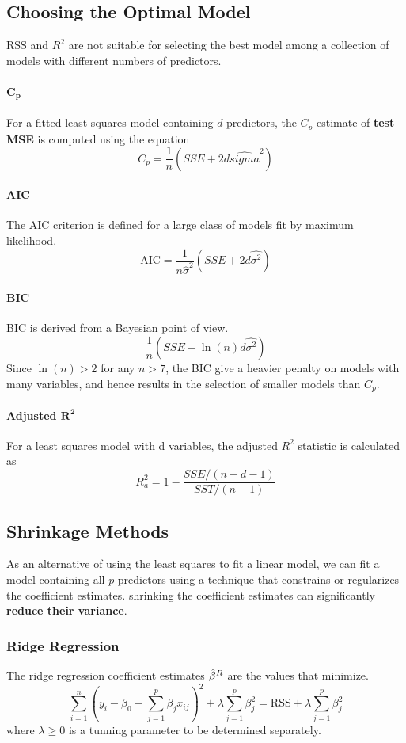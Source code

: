 \subsection{Choosing the Optimal Model}
RSS and $R^2$ are not suitable for selecting the best model among a collection of models with different numbers of predictors.

\paragraph{$\mathbf{C_p}$}
For a fitted least squares model containing $d$ predictors, the $C_p$ estimate of \textbf{test MSE} is computed using the equation
\[ C_p = \frac{1}{n} (SSE + 2d\hat{sigma}^2) \]

\paragraph{AIC}
The AIC criterion is defined for a large class of models fit by maximum likelihood.
\[ \mathrm{AIC} = \frac{1}{n\hat{\sigma}^2} (SSE + 2d\hat{\sigma^2}) \]

\paragraph{BIC}
BIC is derived from a Bayesian point of view.
\[ \frac{1}{n} (SSE + \ln(n)d\hat{\sigma^2}) \]
Since $\ln(n) > 2$ for any $n>7$, the BIC give a heavier penalty on models with many variables, and hence results in the selection of smaller models than $C_p$.

\paragraph{Adjusted $\mathbf{R^2}$}
For a least squares model with d variables, the adjusted $R^2$ statistic is calculated as
\[ R_a^2 = 1 - \frac{SSE / (n-d-1)}{SST / (n-1)} \]

\subsection{Shrinkage Methods}
As an alternative of using the least squares to fit a linear model, we can fit a model containing all $p$ predictors using a technique that constrains or regularizes the coefficient estimates. shrinking the coefficient estimates can significantly \textbf{reduce their variance}.

\subsubsection{Ridge Regression}
The ridge regression coefficient estimates $\hat{\beta}^R$ are the values that minimize.
\[ \sum_{i=1}^{n}\left(y_{i}-\beta_{0}-\sum_{j=1}^{p} \beta_{j} x_{i j}\right)^{2}+\lambda \sum_{j=1}^{p} \beta_{j}^{2}=\mathrm{RSS}+\lambda \sum_{j=1}^{p} \beta_{j}^{2} \]
where $\lambda \geq 0$ is a tunning parameter to be determined separately.

